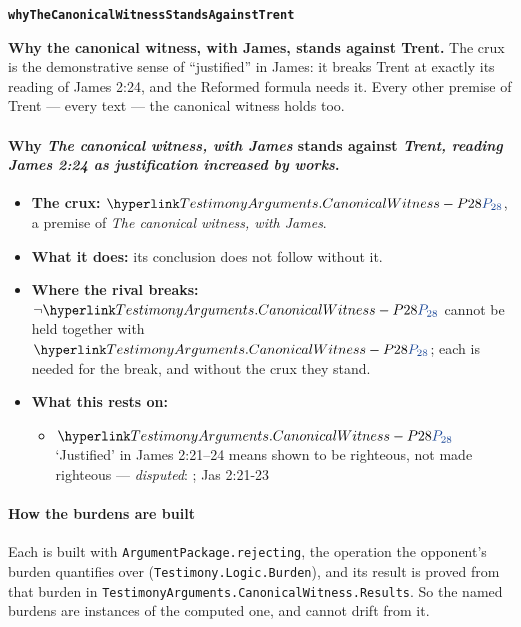 \documentclass[11pt,paper=\testimonypaper,DIV=13,parskip=false]{scrartcl}
\begin{document}
\par\medskip\noindent\textbf{\texttt{why\allowbreak{}The\allowbreak{}Canonical\allowbreak{}Witness\allowbreak{}Stands\allowbreak{}Against\allowbreak{}Trent}}\par\nobreak\noindent
\textbf{Why the canonical witness, with James, stands against Trent.} The crux is the demonstrative sense of “justified” in James: it breaks Trent at exactly its reading of James 2:24, and the Reformed formula needs it. Every other premise of Trent — every text — the canonical witness holds too.

\paragraph{Why \emph{The canonical witness, with James} stands against \emph{Trent, reading James 2:24 as justification increased by works}.}
\begin{itemize}
\item \textbf{The crux:} \(\pvar{TestimonyArguments.CanonicalWitness}{28}\), a premise of \emph{The canonical witness, with James}.
\item \textbf{What it does:} its conclusion does not follow without it.
\item \textbf{Where the rival breaks:} \(\lnot \pvar{TestimonyArguments.CanonicalWitness}{28}\) cannot be held together with \(\pvar{TestimonyArguments.CanonicalWitness}{28}\); each is needed for the break, and without the crux they stand.
\item \textbf{What this rests on:}
\begin{itemize}
\item \(\pvar{TestimonyArguments.CanonicalWitness}{28}\) ‘Justified’ in James 2:21–24 means shown to be righteous, not made righteous --- \emph{disputed}: \cite[III.xvii.11]{calvin-institutes-1960}; Jas 2:21-23
\end{itemize}
\end{itemize}
\paragraph*{How the burdens are built}
\leavevmode\par\nobreak
Each is built with \texttt{Argument\allowbreak{}Package.rejecting}, the operation the opponent’s burden quantifies over (\texttt{Testimony.Logic.Burden}), and its result is proved from that burden in \texttt{Testimony\allowbreak{}Arguments.Canonical\allowbreak{}Witness.Results}. So the named burdens are instances of the computed one, and cannot drift from it.
\end{document}

